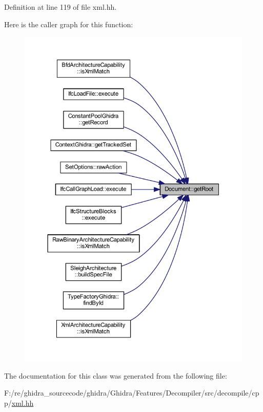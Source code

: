 Definition at line 119 of file xml.\+hh.

Here is the caller graph for this function\+:
\nopagebreak
\begin{figure}[H]
\begin{center}
\leavevmode
\includegraphics[width=350pt]{class_document_ad9f1827ee45d31ba0a682db474b96c14_icgraph}
\end{center}
\end{figure}


The documentation for this class was generated from the following file\+:\begin{DoxyCompactItemize}
\item 
F\+:/re/ghidra\+\_\+sourcecode/ghidra/\+Ghidra/\+Features/\+Decompiler/src/decompile/cpp/\mbox{\hyperlink{xml_8hh}{xml.\+hh}}\end{DoxyCompactItemize}
